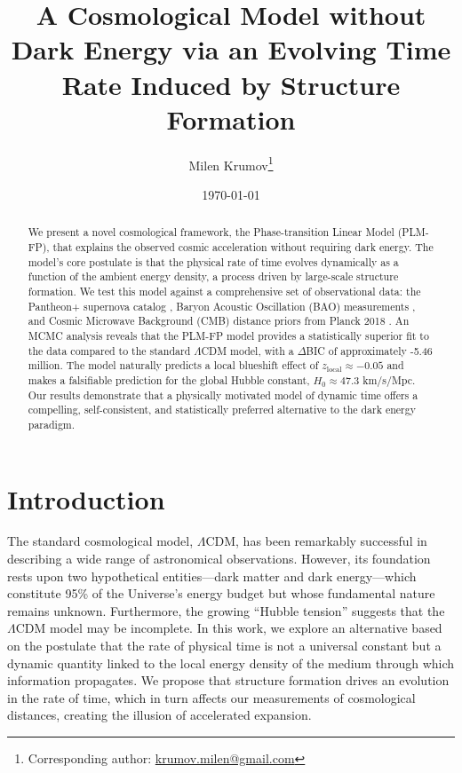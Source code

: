 \documentclass[12pt, a4paper]{article}
\title{A Cosmological Model without Dark Energy via an Evolving Time Rate Induced by Structure Formation}
\author[1]{Milen Krumov\thanks{Corresponding author: \href{mailto:krumov.milen@gmail.com}{krumov.milen@gmail.com}}}
\affil[1]{Independent Researcher, Bulgaria (ORCID: \href{https://orcid.org/0009-0008-3F57-9060}{0009-0008-3957-9060})}
\date{\today}
\begin{document}
\maketitle

\begin{abstract}
We present a novel cosmological framework, the Phase-transition Linear Model (PLM-FP), that explains the observed cosmic acceleration without requiring dark energy. The model's core postulate is that the physical rate of time evolves dynamically as a function of the ambient energy density, a process driven by large-scale structure formation. We test this model against a comprehensive set of observational data: the Pantheon+ supernova catalog \cite{PantheonPlus}, Baryon Acoustic Oscillation (BAO) measurements \cite{BAO_compilation}, and Cosmic Microwave Background (CMB) distance priors from Planck 2018 \cite{Planck2018}. An MCMC analysis reveals that the PLM-FP model provides a statistically superior fit to the data compared to the standard $\Lambda$CDM model, with a $\Delta$BIC of approximately -5.46 million. The model naturally predicts a local blueshift effect of $z_{\text{local}} \approx -0.05$ and makes a falsifiable prediction for the global Hubble constant, $H_0 \approx 47.3$ km/s/Mpc. Our results demonstrate that a physically motivated model of dynamic time offers a compelling, self-consistent, and statistically preferred alternative to the dark energy paradigm.
\end{abstract}

\section{Introduction}
The standard cosmological model, $\Lambda$CDM, has been remarkably successful in describing a wide range of astronomical observations. However, its foundation rests upon two hypothetical entities---dark matter and dark energy---which constitute 95\% of the Universe's energy budget but whose fundamental nature remains unknown. Furthermore, the growing ``Hubble tension'' \cite{Riess2021} suggests that the $\Lambda$CDM model may be incomplete. In this work, we explore an alternative based on the postulate that the rate of physical time is not a universal constant but a dynamic quantity linked to the local energy density of the medium through which information propagates. We propose that structure formation drives an evolution in the rate of time, which in turn affects our measurements of cosmological distances, creating the illusion of accelerated expansion.
\end{document}
